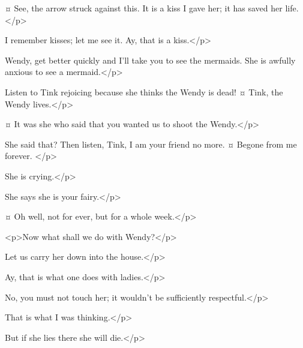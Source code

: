 \begin{drama}
\peterspeaks {}¤
See, the arrow struck against this.
It is a kiss I gave her; it has saved her life.</p>

\slightlyspeaks
I remember kisses; let me see it.
Ay, that is a kiss.</p>

\peterspeaks
Wendy, get better quickly and I'll take you to see the mermaids.
She is awfully anxious to see a mermaid.</p>


\curlyspeaks
Listen to Tink rejoicing because she thinks the Wendy is dead!
¤
Tink, the Wendy lives.</p>


\secondtwinspeaks {}¤
It was she who said that you wanted us to shoot the Wendy.</p>

\peterspeaks
She said that?
Then listen, Tink, I am your friend no more.
¤
Begone from me forever.
</p>

\curlyspeaks
She is crying.</p>

\tootlesspeaks
She says she is your fairy.</p>

\peterspeaks {}¤
Oh well, not for ever, but for a whole week.</p>


<p>Now what shall we do with Wendy?</p>

\curlyspeaks
Let us carry her down into the house.</p>

\slightlyspeaks
Ay, that is what one does with ladies.</p>

\peterspeaks
No, you must not touch her; it wouldn't be sufficiently respectful.</p>

\slightlyspeaks
That is what I was thinking.</p>

\tootlesspeaks
But if she lies there she will die.</p>


\end{drama}
